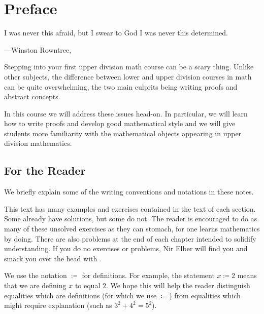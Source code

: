 \documentclass[../main.tex]{subfiles}
\begin{document}
\setcounter{chapter}{-1}
\chapter{Preface} %
\epigraph{I was never this afraid, but I swear to God I was never this determined.}
{---Winston Rowntree, \cite{people-watching-nostalgia}}

Stepping into your first upper division math course can be a scary thing.
Unlike other subjects, the difference between lower and upper division courses in math can be quite overwhelming, the two main culprits being writing proofs and abstract concepts.

In this course we will address these issues head-on. In particular, we will learn how to write proofs and develop good mathematical style and we will give students more familiarity with the mathematical objects appearing in upper division mathematics.

\section{For the Reader}
We briefly explain some of the writing conventions and notations in these notes.

This text has many examples and exercises contained in the text of each section. Some already have solutions, but some do not. The reader is encouraged to do as many of these unsolved exercises as they can stomach, for one learns mathematics by doing. There are also problems at the end of each chapter intended to solidify understanding. If you do no exercises or problems, Nir Elber will find you and smack you over the head with \cite{rosen}.

We use the notation $\coloneqq$ for definitions. For example, the statement $x\coloneqq2$ means that we are defining $x$ to equal $2$. We hope this will help the reader distinguish equalities which are definitions (for which we use $\coloneqq$) from equalities which might require explanation (such as $3^2+4^2=5^2$).
\end{document}
